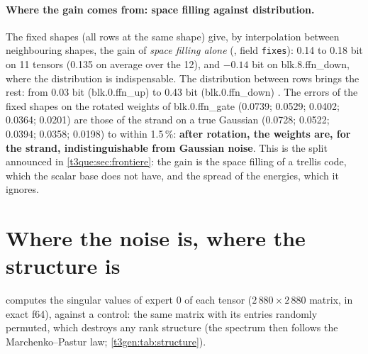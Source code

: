 \paragraph{Where the gain comes from: space filling against distribution.} The fixed shapes (all rows at the same shape) give, by interpolation between neighbouring shapes, the gain of \emph{space filling alone} (, field \texttt{fixes}): 0.14 to 0.18 bit on 11 tensors (0.135 on average over the 12), and $-0.14$ bit on blk.8.ffn\_down, where the distribution is indispensable. The distribution between rows brings the rest: from 0.03 bit (blk.0.ffn\_up) to 0.43 bit (blk.0.ffn\_down) \mes. The errors of the fixed shapes on the rotated weights of blk.0.ffn\_gate (0.0739; 0.0529; 0.0402; 0.0364; 0.0201) are those of the strand on a true Gaussian (0.0728; 0.0522; 0.0394; 0.0358; 0.0198) to within 1.5\,\%: \textbf{after rotation, the weights are, for the strand, indistinguishable from Gaussian noise}. This is the split announced in \cref{t3que:sec:frontiere}: the gain is the space filling of a trellis code, which the scalar base does not have, and the spread of the energies, which it ignores.

\section{Where the noise is, where the structure is}\label{t3gen:sec:structure}

 computes the singular values of expert 0 of each tensor ($2\,880 \times 2\,880$ matrix, in exact f64), against a control: the same matrix with its entries randomly permuted, which destroys any rank structure (the spectrum then follows the Marchenko--Pastur law; \cref{t3gen:tab:structure}).

